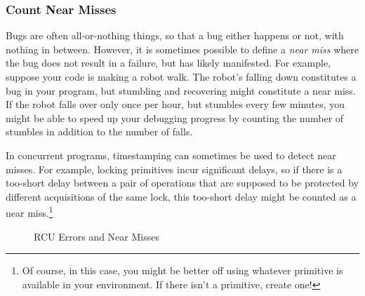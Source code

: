 \subsubsection{Count Near Misses}
\label{sec:debugging:Count Near Misses}

Bugs are often all-or-nothing things, so that a bug either happens
or not, with nothing in between.
However, it is sometimes possible to define a \emph{near miss} where
the bug does not result in a failure, but has likely manifested.
For example, suppose your code is making a robot walk.
The robot's falling down constitutes a bug in your program, but
stumbling and recovering might constitute a near miss.
If the robot falls over only once per hour, but stumbles every few
minutes, you might be able to speed up your debugging progress by
counting the number of stumbles in addition to the number of falls.

In concurrent programs, timestamping can sometimes be used to detect
near misses.
For example, locking primitives incur significant delays, so if there is
a too-short delay between a pair of operations that are supposed
to be protected by different acquisitions of the same lock, this too-short
delay might be counted as a near miss.\footnote{
	Of course, in this case, you might be better off using
	whatever  primitive is available
	in your environment.
	If there isn't a  primitive, create one!}

\begin{figure}
\centering
{}
\caption{RCU Errors and Near Misses}
\label{fig:debugging:RCU Errors and Near Misses}
\end{figure}


